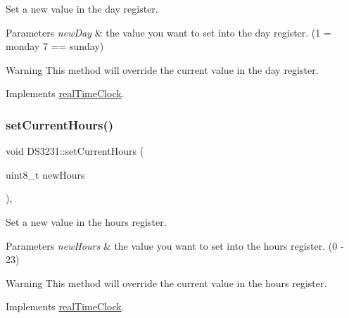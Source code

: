 Set a new value in the day register. 


\begin{DoxyParams}{Parameters}
{\em new\+Day} & the value you want to set into the day register. (1 = monday 7 == sunday) \\
\hline
\end{DoxyParams}
\begin{DoxyWarning}{Warning}
This method will override the current value in the day register. 
\end{DoxyWarning}


Implements \mbox{\hyperlink{classreal_time_clock_a4a80a695cbb55860921f92509fae0cd0}{real\+Time\+Clock}}.

\mbox{\label{class_d_s3231_ae59c15abcccd8e27eadebcd150db810e}} 
\subsubsection{\texorpdfstring{set\+Current\+Hours()}{setCurrentHours()}}
{\footnotesize\ttfamily void D\+S3231\+::set\+Current\+Hours (\begin{DoxyParamCaption}\item[{uint8\+\_\+t}]{new\+Hours }\end{DoxyParamCaption})\hspace{0.3cm}{\ttfamily [override]}, {\ttfamily [virtual]}}



Set a new value in the hours register. 


\begin{DoxyParams}{Parameters}
{\em new\+Hours} & the value you want to set into the hours register. (0 -\/ 23) \\
\hline
\end{DoxyParams}
\begin{DoxyWarning}{Warning}
This method will override the current value in the hours register. 
\end{DoxyWarning}


Implements \mbox{\hyperlink{classreal_time_clock_a515d9de6067ae563bff5217da5100a23}{real\+Time\+Clock}}.

\mbox{\label{class_d_s3231_a221f92091b813108b3515f6676be29c8}} 
